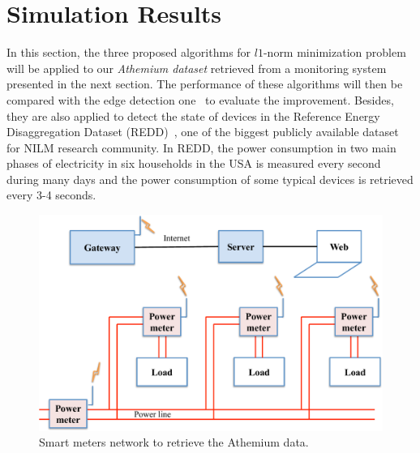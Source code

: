 \section{Simulation Results}
In this section, the three proposed algorithms for $l1$-norm minimization problem will be applied to our \emph{Athemium dataset} retrieved from a monitoring system presented in the next section. The performance of these algorithms will then be compared with the edge detection one~\cite{Hart92} to evaluate the improvement. Besides, they are also applied to detect the state of devices in the Reference Energy Disaggregation Dataset (REDD)~\cite{Kolter11redd}, one of the biggest publicly available dataset for NILM research community. In REDD, the power consumption in two main phases of electricity in six households in the USA is measured every second during many days and the power consumption of some typical devices is retrieved every 3-4 seconds.





\begin{figure}[h]
\centering
\includegraphics[width=.8\textwidth]{./chapters/chapter3/images/measurement_system.pdf} 
\caption{Smart meters network to retrieve the Athemium data.} 
\label{fig:L2} 
\end{figure}

